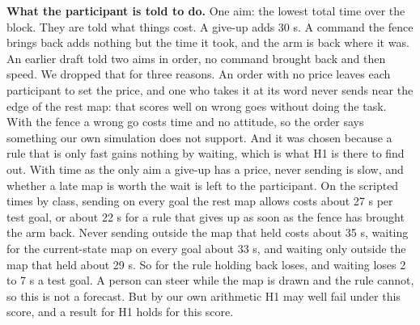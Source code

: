 \documentclass[pdflatex,sn-mathphys-num]{sn-jnl}
\begin{document}
\textbf{What the participant is told to do.} One aim: the lowest total time over the block. They are told what
things cost. A give-up adds 30 s. A command the fence brings back adds nothing but the time it took, and the arm
is back where it was. %
An earlier draft told two aims in order, no command brought back and then speed. We dropped that for three
reasons. An order with no price leaves each participant to set the price, and one who takes it at its word never
sends near the edge of the rest map: that scores well on wrong goes without doing the task. With the fence a
wrong go costs time and no attitude, so the order says something our own simulation does not support. %
And it was chosen because a rule that is only fast gains nothing by waiting, which is what H1 is there to find
out. With time as the only aim a give-up has a price, never sending is slow, and whether a late map is worth the
wait is left to the participant. On the scripted times by class, sending on every goal the rest map allows costs
about 27 s per test goal, or about 22 s for a rule that gives up as soon as the fence has brought the arm back.
Never sending outside the map that held costs about 35 s, waiting for the current-state map on every goal about
33 s, and waiting only outside the map that held about 29 s. %
So for the rule holding back loses, and waiting loses 2 to 7 s a test goal. A person can steer while the map is
drawn and the rule cannot, so this is not a forecast. But by our own arithmetic H1 may well fail under this
score, and a result for H1 holds for this score.
\end{document}
